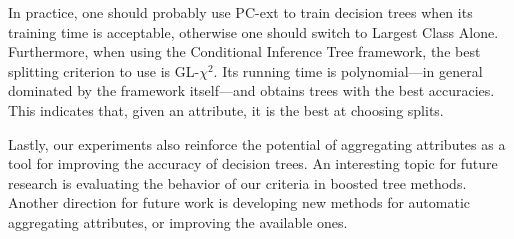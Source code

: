 In practice, one should probably use PC-ext to train decision trees when its training time is acceptable, otherwise one should switch to Largest Class Alone. Furthermore, when using the Conditional Inference Tree framework, the best splitting criterion to use is GL-$\chi^2$. Its running time is polynomial---in general dominated by the framework itself---and obtains trees with the best accuracies. This indicates that, given an attribute, it is the best at choosing splits.

Lastly, our experiments also reinforce the potential of aggregating attributes as a tool for improving the accuracy of decision trees. An interesting topic for  future research is evaluating the behavior of our criteria in boosted tree methods. Another direction for future work is developing new methods for automatic aggregating attributes, or improving the available ones.
